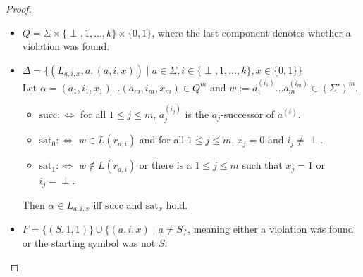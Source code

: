 \documentclass{article}
\begin{document}
\begin{proof}
	\begin{itemize}
		\item $Q = \Sigma \times \{\perp, 1, \dots, k\} \times \{0, 1\}$, where the last component denotes whether a violation was found.
		\item $\Delta = \{ (L_{a,i,x}, a, (a, i, x)) \mid a \in \Sigma, i \in \{\perp, 1, \dots, k\}, x \in \{0,1\} \}$ \\
			Let $\alpha = (a_1, i_1, x_1) \dots (a_m, i_m, x_m) \in Q^m$ and $w := a_1^{(i_1)} \dots a_m^{(i_m)} \in (\Sigma')^m$.
			\begin{itemize}
				\item $\text{succ} :\Leftrightarrow$ for all $1 \leq j \leq m$, $a_j^{(i_j)}$ is the $a_j$-successor of $a^{(i)}$.
				\item $\text{sat}_0 :\Leftrightarrow$ $w \in L(r_{a,i})$ and for all $1 \leq j \leq m$, $x_j = 0$ and $i_j \neq \perp$.
				\item $\text{sat}_1 :\Leftrightarrow$ $w \notin L(r_{a,i})$ or there is a $1 \leq j \leq m$ such that $x_j = 1$ or $i_j = \perp$.
			\end{itemize}
			Then $\alpha \in L_{a,i,x}$ iff $\text{succ}$ and $\text{sat}_x$ hold.
		\item $F = \{ (S, 1, 1) \} \cup \{ (a, i, x) \mid a \neq S \}$, meaning either a violation was found or the starting symbol was not $S$.
\end{itemize}
\end{proof}
\end{document}
